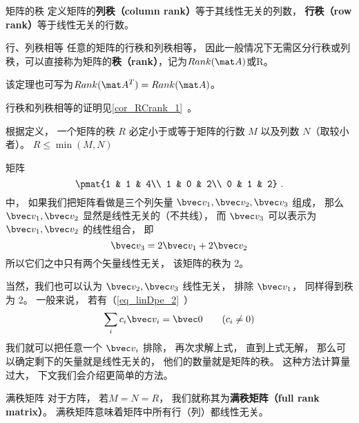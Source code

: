 

\begin{definition}{矩阵的秩}
定义矩阵的\textbf{列秩（column rank）}等于其线性无关的列数， \textbf{行秩（row rank）}等于线性无关的行数。
\end{definition}

\begin{theorem}{行、列秩相等}
任意的矩阵的行秩和列秩相等， 因此一般情况下无需区分行秩或列秩，可以直接称为矩阵的\textbf{秩（rank）}，记为$Rank(\mat A)$或R。

该定理也可写为$Rank (\mat A^T)=Rank(\mat A)$。
\end{theorem}
行秩和列秩相等的证明见\autoref{cor_RCrank_1}~。

\begin{theorem}{}
根据定义， 一个矩阵的秩 $R$ 必定小于或等于矩阵的行数 $M$ 以及列数 $N$（取较小者）。 $R\leq \min (M, N)$
\end{theorem}

\begin{example}{}
矩阵
\begin{equation}\label{eq_MatRnk_1}
\pmat{1 & 1 & 4\\ 1 & 0 & 2\\ 0 & 1 & 2}~.
\end{equation}
中， 如果我们把矩阵看做是三个列矢量 $\bvec v_1, \bvec v_2, \bvec v_3$ 组成， 那么 $\bvec v_1, \bvec v_2$ 显然是线性无关的（不共线）， 而 $\bvec v_3$ 可以表示为 $\bvec v_1, \bvec v_2$ 的线性组合， 即
\begin{equation}
\bvec v_3 = 2\bvec v_1 + 2\bvec v_2
\end{equation}
所以它们之中只有两个矢量线性无关， 该矩阵的秩为 2。

当然，我们也可以认为 $\bvec v_2, \bvec v_3$ 线性无关， 排除 $\bvec v_1$， 同样得到秩为 2。 一般来说， 若有（\autoref{eq_linDpe_2}~）
\begin{equation}
\sum_i c_i \bvec v_i = \bvec 0 \qquad (c_i \ne 0)
\end{equation}
我们就可以把任意一个 $\bvec v_i$ 排除， 再次求解上式， 直到上式无解， 那么可以确定剩下的矢量就是线性无关的， 他们的数量就是矩阵的秩。 这种方法计算量过大， 下文我们会介绍更简单的方法。
\end{example}

\begin{definition}{满秩矩阵}
对于方阵， 若$M = N = R$， 我们就称其为\textbf{满秩矩阵（full rank matrix）}。 满秩矩阵意味着矩阵中所有行（列）都线性无关。
\end{definition}

